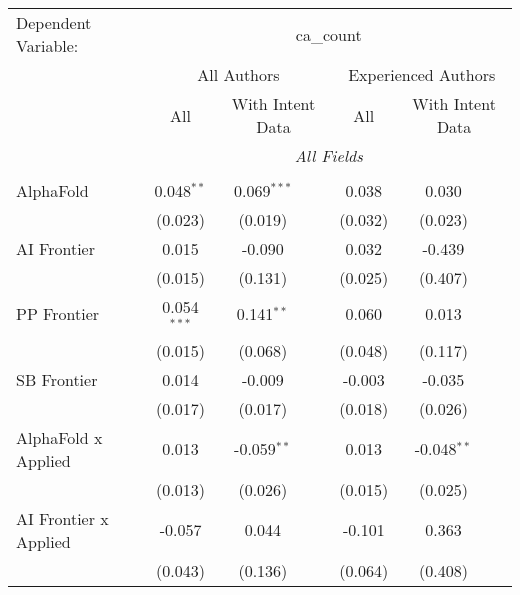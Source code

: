 \begingroup
\centering
\begin{tabular}{lcccccc}
   \tabularnewline \midrule \midrule
   Dependent Variable: & \multicolumn{6}{c}{ca\_count}\\
 & \multicolumn{3}{c}{All Authors} & \multicolumn{3}{c}{Experienced Authors} \\
\cmidrule(lr){2-4} \cmidrule(lr){5-7}
 & \multicolumn{1}{c}{All} & \multicolumn{2}{c}{With Intent Data} & \multicolumn{1}{c}{All} & \multicolumn{2}{c}{With Intent Data} \\
\cmidrule(lr){2-2} \cmidrule(lr){3-4} \cmidrule(lr){5-5} \cmidrule(lr){6-7}
 & \multicolumn{6}{c}{\textit{All Fields}} \\ \\
   AlphaFold                      & 0.048$^{**}$  & 0.069$^{***}$ &                & 0.038   & 0.030         &   \\   
                                  & (0.023)       & (0.019)       &                & (0.032) & (0.023)       &   \\   
   AI Frontier                    & 0.015         & -0.090        &                & 0.032   & -0.439        &   \\   
                                  & (0.015)       & (0.131)       &                & (0.025) & (0.407)       &   \\   
   PP Frontier                    & 0.054$^{***}$ & 0.141$^{**}$  &                & 0.060   & 0.013         &   \\   
                                  & (0.015)       & (0.068)       &                & (0.048) & (0.117)       &   \\   
   SB Frontier                    & 0.014         & -0.009        &                & -0.003  & -0.035        &   \\   
                                  & (0.017)       & (0.017)       &                & (0.018) & (0.026)       &   \\   
   AlphaFold x Applied            & 0.013         & -0.059$^{**}$ &                & 0.013   & -0.048$^{**}$ &   \\   
                                  & (0.013)       & (0.026)       &                & (0.015) & (0.025)       &   \\   
   AI Frontier x Applied          & -0.057        & 0.044         &                & -0.101  & 0.363         &   \\   
                                  & (0.043)       & (0.136)       &                & (0.064) & (0.408)       &   \\   

\end{tabular}
